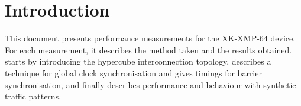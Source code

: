 \section{Introduction}

This document presents performance measurements for the XK-XMP-64 device. For
each measurement, it describes the method taken and the results obtained.
 starts by introducing the hypercube interconnection topology,
 describes a technique for global clock synchronisation and gives
timings for barrier synchronisation, and finally  describes
performance and behaviour with synthetic traffic patterns.
